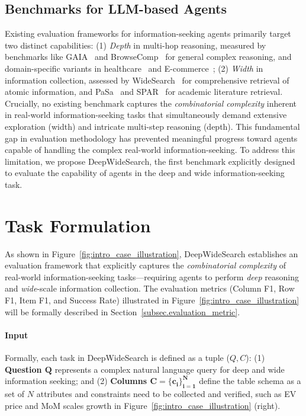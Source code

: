 \documentclass[11pt, letterpaper, logo, onecolumn, copyright, numbering]{paper_improved}
\let\cite\citep
\begin{document}
\subsection{Benchmarks for LLM-based Agents}
Existing evaluation frameworks for information-seeking agents primarily target two distinct capabilities: (1) \textit{Depth} in multi-hop reasoning, measured by benchmarks like GAIA~\cite{mialon2023gaiabenchmarkgeneralai} and BrowseComp~\cite{wei2025browsecompsimplechallengingbenchmark} for general complex reasoning, and domain-specific variants in healthcare~\cite{chen2025medbrowsecompbenchmarkingmedicaldeep} and E-commerce~\cite{lyu2025deepshopbenchmarkdeepresearch}; (2) \textit{Width} in information collection, assessed by WideSearch~\cite{wong2025widesearch} for comprehensive retrieval of atomic information, and PaSa~\cite{he2025pasa} and SPAR~\cite{shi2025sparscholarpaperretrieval} for academic literature retrieval.
Crucially, no existing benchmark captures the \textit{combinatorial complexity} inherent in real-world information-seeking tasks that simultaneously demand extensive exploration (width) and intricate multi-step reasoning (depth). This fundamental gap in evaluation methodology has prevented meaningful progress toward agents capable of handling the complex real-world information-seeking. To address this limitation, we propose DeepWideSearch, the first benchmark explicitly designed to evaluate the capability of agents in the deep and wide information-seeking task.

\section{Task Formulation}

As shown in Figure~\ref{fig:intro_case_illustration}, DeepWideSearch establishes an evaluation framework that explicitly captures the \textit{combinatorial complexity} of real-world information-seeking tasks—requiring agents to perform \textit{deep} reasoning and \textit{wide}-scale information collection. 
The evaluation metrics (Column F1, Row F1, Item F1, and Success Rate) illustrated in Figure~\ref{fig:intro_case_illustration} will be formally described in Section~\ref{subsec.evaluation_metric}.

\paragraph{Input} Formally, each task in DeepWideSearch is defined as a tuple ($Q, C$):
(1) \textbf{Question $\boldsymbol{Q}$} represents a complex natural language query for deep and wide information seeking; 
and (2) \textbf{Columns $\boldsymbol{C=\{c_i\}_{i=1}^N}$} define the table schema as a set of $N$ attributes and constraints need to be collected and verified, such as EV price and MoM scales growth in Figure~\ref{fig:intro_case_illustration} (right).
\end{document}
